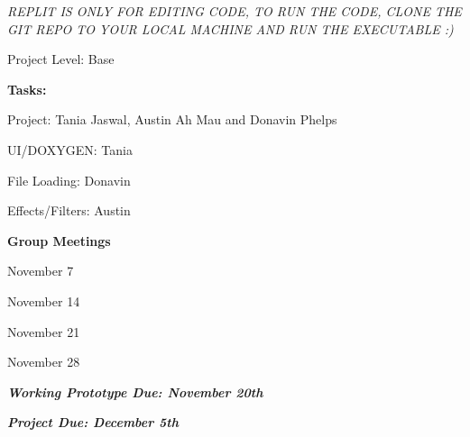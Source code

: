 {\itshape R\+E\+P\+L\+IT IS O\+N\+LY F\+OR E\+D\+I\+T\+I\+NG C\+O\+DE, TO R\+UN T\+HE C\+O\+DE, C\+L\+O\+NE T\+HE G\+IT R\+E\+PO TO Y\+O\+UR L\+O\+C\+AL M\+A\+C\+H\+I\+NE A\+ND R\+UN T\+HE E\+X\+E\+C\+U\+T\+A\+B\+LE \+:)}

Project Level\+: Base

{\bfseries Tasks\+:}

Project\+: Tania Jaswal, Austin Ah Mau and Donavin Phelps

U\+I/\+D\+O\+X\+Y\+G\+EN\+: Tania

File Loading\+: Donavin

Effects/\+Filters\+: Austin

{\bfseries Group Meetings}

November 7

November 14

November 21

November 28

{\itshape {\bfseries Working Prototype Due\+: November 20th}}

{\itshape {\bfseries Project Due\+: December 5th}} 
